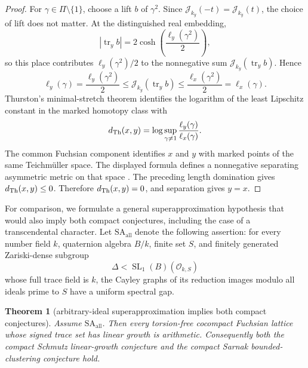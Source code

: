 \documentclass[11pt,reqno]{amsart}
\newtheorem{theorem}{Theorem}[section]
\theoremstyle{definition}
\theoremstyle{remark}
\newcommand{\cO}{\mathcal O}
\newcommand{\Tr}{\operatorname{tr}}
\newcommand{\SL}{\operatorname{SL}}
\begin{document}
\begin{proof}
For \(\gamma\in\Pi\setminus\{1\}\), choose a lift \(b\) of
\(\gamma^2\).  Since
\(\mathcal J_{k_y}(-t)=\mathcal J_{k_y}(t)\), the choice of lift does not
matter.  At the distinguished real embedding,
\[
 |\Tr_y b|=2\cosh\!\left(\frac{\ell_y(\gamma^2)}2\right),
\]
so this place contributes \(\ell_y(\gamma^2)/2\) to the nonnegative sum
\(\mathcal J_{k_y}(\Tr_y b)\).  Hence
\[
 \ell_y(\gamma)
 =\frac{\ell_y(\gamma^2)}2
 \le \mathcal J_{k_y}(\Tr_y b)
 \le \frac{\ell_x(\gamma^2)}2
 =\ell_x(\gamma).
\]
Thurston's minimal-stretch theorem identifies the logarithm of the least
Lipschitz constant in the marked homotopy class with
\[
 d_{\rm Th}(x,y)
 =\log\sup_{\gamma\ne1}\frac{\ell_y(\gamma)}{\ell_x(\gamma)}.
\]
The common Fuchsian component identifies \(x\) and \(y\) with marked points
of the same Teichm\"uller space.  The displayed formula defines a
nonnegative separating asymmetric metric on that space
\cite{ThurstonStretch}.  The preceding length domination gives
\(d_{\rm Th}(x,y)\le0\).  Therefore \(d_{\rm Th}(x,y)=0\), and separation
gives \(y=x\).
\end{proof}

For comparison, we formulate a general superapproximation hypothesis that
would also imply both compact conjectures, including the case of a
transcendental character.  Let
\(\mathrm{SA}_{\mathrm{all}}\) denote the following assertion:
for every number field \(k\), quaternion algebra \(B/k\), finite set
\(S\), and finitely generated Zariski-dense subgroup
\[
 \Delta<\SL_1(B)(\cO_{k,S})
\]
whose full trace field is \(k\), the Cayley graphs of its reduction images
modulo all ideals prime to \(S\) have a uniform spectral gap.

\begin{theorem}[arbitrary-ideal superapproximation implies both compact conjectures]
\label{thm:superapproximation-implies-compact}
Assume \(\mathrm{SA}_{\mathrm{all}}\).  Then every torsion-free cocompact
Fuchsian lattice whose signed trace set has linear growth is arithmetic.
Consequently both the compact Schmutz linear-growth conjecture and the
compact Sarnak bounded-clustering conjecture hold.
\end{theorem}
\end{document}
